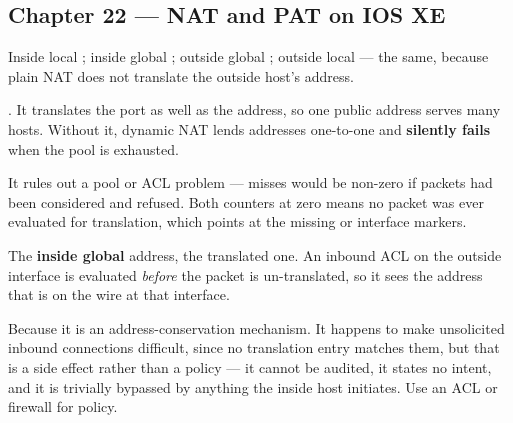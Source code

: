 \subsection*{Chapter 22 --- NAT and PAT on IOS XE}
\begin{tightnum}
  \item Inside local ; inside global ; outside
        global ; outside local  --- the same,
        because plain NAT does not translate the outside host's address.
  \item {}. It translates the port as well as the address, so one
        public address serves many hosts. Without it, dynamic NAT lends addresses
        one-to-one and \textbf{silently fails} when the pool is exhausted.
  \item It rules out a pool or ACL problem --- misses would be non-zero if packets
        had been considered and refused. Both counters at zero means no packet was
        ever evaluated for translation, which points at the missing  or  interface markers.
  \item The \textbf{inside global} address, the translated one. An inbound ACL on
        the outside interface is evaluated \emph{before} the packet is
        un-translated, so it sees the address that is on the wire at that
        interface.
  \item Because it is an address-conservation mechanism. It happens to make
        unsolicited inbound connections difficult, since no translation entry
        matches them, but that is a side effect rather than a policy --- it cannot
        be audited, it states no intent, and it is trivially bypassed by anything
        the inside host initiates. Use an ACL or firewall for policy.
\end{tightnum}

